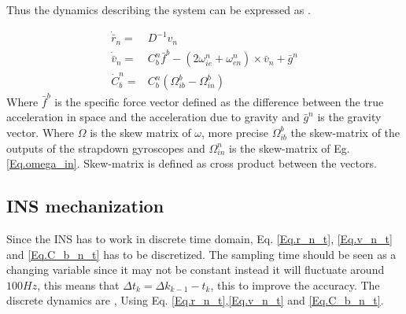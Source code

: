 \noindent Thus the dynamics describing the system can be expressed as \cite{nonlinear}.

\begin{align}
\dot{\bar{r}}_n = & D^{-1}v_n
\label{Eq.r_n_t}\\
\dot{\bar{v}}_n = & C_b^n \bar{f}^b-(2\omega_{ie}^n+\omega_{en}^n) \times \bar{v}_n +\bar{g}^n
\label{Eq.v_n_t}\\
\dot{C}_b^n = & C_b^n(\Omega_{ib}^b - \Omega_{in}^b)
\label{Eq.C_b_n_t}
\end{align}
Where $\bar{f}^b$ is the specific force vector defined as the difference between the true acceleration in
space and the acceleration due to gravity and $\bar{g}^n$ is the gravity vector. Where $\Omega$ is the skew matrix of $\omega$, more precise $\Omega_{ib}^b$ the skew-matrix of the outputs of the strapdown gyroscopes and $\Omega_{in}^n$ is the skew-matrix of Eg. \eqref{Eq.omega_in}. Skew-matrix is defined as cross product between the vectors.


\subsection{INS mechanization}
Since the INS has to work in discrete time domain, Eq. \eqref{Eq.r_n_t}, \eqref{Eq.v_n_t} and \eqref{Eq.C_b_n_t} has to be discretized. The sampling time should be seen as a changing variable since it may not be constant instead it will fluctuate around $100Hz$, this means that $\Delta t_k = \Delta k_{k-1} - t_{k}$, this to improve the accuracy. The discrete dynamics are \cite{non-linear}, Using Eq. \eqref{Eq.r_n_t},\eqref{Eq.v_n_t} and \eqref{Eq.C_b_n_t}.


